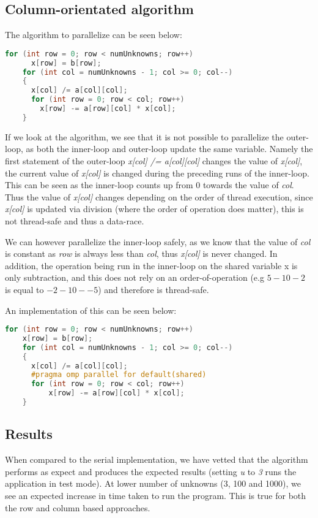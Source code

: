   \subsection{Column-orientated algorithm}
  The algorithm to parallelize can be seen below:
  \begin{lstlisting}[language=C++]
    for (int row = 0; row < numUnknowns; row++)
      x[row] = b[row];
    for (int col = numUnknowns - 1; col >= 0; col--)
    {
      x[col] /= a[col][col];
      for (int row = 0; row < col; row++)
        x[row] -= a[row][col] * x[col];
    }
  \end{lstlisting}

  If we look at the algorithm, we see that it is not possible to parallelize the outer-loop, as both the inner-loop and outer-loop update the same variable. 
  Namely the first statement of the outer-loop \textit{x[col] /= a[col][col]} changes the value of \textit{x[col]}, the current value of \textit{x[col]} is changed during the preceding runs
  of the inner-loop. This can be seen as the inner-loop counts up from 0 towards the value of \textit{col}. Thus the value of \textit{x[col]} changes depending on the order of thread execution,
  since \textit{x[col]} is updated via division (where the order of operation does matter), this is not thread-safe and thus a data-race. 


  We can however parallelize the inner-loop safely, as we know that the value of \textit{col} is constant as \textit{row} is always less than \textit{col}, thus \textit{x[col]} is never changed.
  In addition, the operation being run in the inner-loop on the shared variable x is only subtraction, and this does not rely on an order-of-operation (e.g $5-10-2$ is equal to $-2-10--5$) and 
  therefore is thread-safe. 

  An implementation of this can be seen below:
  \begin{lstlisting}[language=C++]
    for (int row = 0; row < numUnknowns; row++)
    x[row] = b[row];
    for (int col = numUnknowns - 1; col >= 0; col--)
    {
      x[col] /= a[col][col];
      #pragma omp parallel for default(shared)  
      for (int row = 0; row < col; row++)
          x[row] -= a[row][col] * x[col];
    }
  \end{lstlisting}

  \subsection{Results}
    When compared to the serial implementation, we have vetted that the algorithm performs as expect and produces the expected results 
    (setting \textit{u} to \textit{3} runs the application in test mode). At lower number of unknowns (3, 100 and 1000), we see an expected increase in time taken to run the program. 
    This is true for both the row and column based approaches. 

